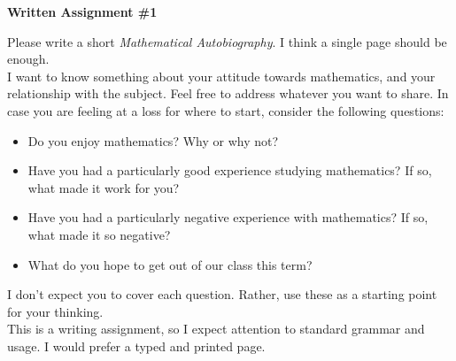 \documentclass[12pt,letterpaper]{article}
\begin{document}
\setlength{\parskip}{1ex plus 0.5ex minus 0.2ex}
\setlength{\parindent}{0pt}

\pagestyle{fancy}
\lfoot{} 
\rfoot{} 

\begin{center}
{
\Large
\textbf{Written Assignment \#1}
}
\end{center}

Please write a short \emph{Mathematical Autobiography}.
I think a single page should be enough.\\

I want to know something about your attitude towards mathematics, and your relationship with the subject.
Feel free to address whatever you want to share.
In case you are feeling at a loss for where to start, consider the following questions:
\begin{itemize}
\item Do you enjoy mathematics? Why or why not?
\item Have you had a particularly good experience studying mathematics?
If so, what made it work for you?
\item Have you had a particularly negative experience with mathematics?
If so, what made it so negative?
\item What do you hope to get out of our class this term?
\end{itemize}
I don't expect you to cover each question. Rather, use these as a starting point for your thinking.\\[.25in]


This is a writing assignment, so I expect attention to standard grammar and usage.
I would prefer a typed and printed page.
\end{document}
